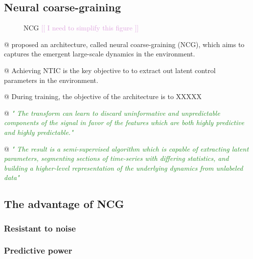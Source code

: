 \documentclass[utf8]{article}
\makeatletter
\newenvironment{ants}
			{
			 \begin{easylist}[itemize]
			}
			{
			\end{easylist}
			}
\newcommand{\rewrite}[1]{\textcolor{ForestGreen}{\textit{"#1"}}\newline}
\newcommand{\includegraphicsTodo}[2][]{%
			\tcbox[%
				adjusted title=\LARGE To Be Modified,
				halign title=right,
				colbacktitle=Orange!75!White,
				coltitle=Black,
				colframe=Red!60!White,
				boxrule=1mm,
				colback=white%
				]{\texttt{[image: \#2]}}}
\newcommand{\idea}[1]{\noindent
				\textcolor{Plum}{[[ #1 ]]}}
\newcommand{\martin}[1]{\todo[color=SpringGreen]{@Martin:\\#1}}
\makeatother
\begin{document}
		
		
			
		\subsection{\martin{todo}Neural coarse-graining}
			\begin{figure}
				\includegraphicsTodo[width=0.8\textwidth]{WritingMaterials/PDFXCview_2018-06-08_14-24-03.png}
				\caption{NCG \idea{I need to simplify this figure}\citep{guttenberg2016neural}}
				\label{fig:NCG}				
			\end{figure}
			
		
		
			\begin{ants}
				@ \citep{guttenberg2016neural} proposed an architecture, called neural coarse-graining (NCG), which aims to captures the emergent large-scale dynamics in the environment. 
				
				@ Achieving NTIC is the key objective to to extract out latent control parameters in the environment.
				
				@ During training, the objective of the architecture is to XXXXX\martin{todo}
				
				 
				@ \rewrite{
					The transform can learn to discard uninformative and unpredictable components of the signal in favor of the features which are both highly predictive and highly predictable.}\citep{guttenberg2016neural}
							
				
				
				@ \rewrite{
					The result is a semi-supervised algorithm which is capable of extracting latent parameters, segmenting sections of time-series with diﬀering statistics, and building a higher-level representation of the underlying dynamics from unlabeled data}\citep{guttenberg2016neural}
				
			\end{ants}
		
		
		
			
		\subsection{The advantage of NCG}
			\subsubsection{Resistant to noise}
			\subsubsection{Predictive power}
\end{document}
